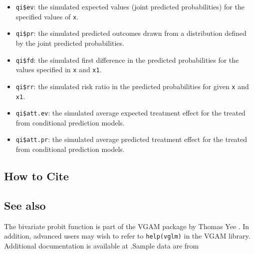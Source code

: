\begin{itemize}
   \begin{itemize}
   \item {\tt qi\$ev}: the simulated expected values (joint predicted
     probabilities) for the specified values of {\tt x}.
   \item {\tt qi\$pr}: the simulated predicted outcomes drawn from a
     distribution defined by the joint predicted probabilities.
   \item {\tt qi\$fd}: the simulated first difference in the predicted
     probabilities for the values specified in {\tt x} and {\tt x1}.
   \item {\tt qi\$rr}: the simulated risk ratio in the predicted
     probabilities for given {\tt x} and {\tt x1}.
   \item {\tt qi\$att.ev}: the simulated average expected treatment
     effect for the treated from conditional prediction models.  
   \item {\tt qi\$att.pr}: the simulated average predicted treatment
     effect for the treated from conditional prediction models.  
   \end{itemize}
\end{itemize}

\subsection*{How to Cite}


\subsection*{See also}
The bivariate probit function is part of the VGAM package by Thomas Yee \citep{YeeHas03}. In addition, advanced users may wish to refer to \texttt{help(vglm)} 
in the VGAM library.  Additional documentation is available at
.Sample data are from \cite{Martin92}
